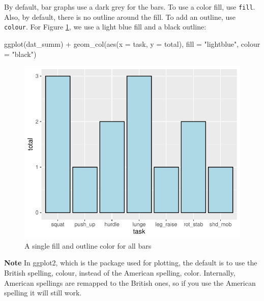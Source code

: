\documentclass[
]{book}
\newenvironment{Shaded}{\begin{snugshade}}{\end{snugshade}}
\newcommand{\AttributeTok}[1]{\textcolor[rgb]{0.77,0.63,0.00}{#1}}
\newcommand{\FunctionTok}[1]{\textcolor[rgb]{0.00,0.00,0.00}{#1}}
\newcommand{\NormalTok}[1]{#1}
\newcommand{\SpecialCharTok}[1]{\textcolor[rgb]{0.00,0.00,0.00}{#1}}
\newcommand{\StringTok}[1]{\textcolor[rgb]{0.31,0.60,0.02}{#1}}
\begin{document}
By default, bar graphs use a dark grey for the bars. To use a color fill, use \texttt{fill}. Also, by default, there is no outline around the fill. To add an outline, use \texttt{colour}. For Figure \ref{fig:FIG-BAR-GRAPH-BASIC-BAR-SINGLE-FILL}, we use a light blue fill and a black outline:

\begin{Shaded}
\begin{Highlighting}[]
\FunctionTok{ggplot}\NormalTok{(dat\_summ) }\SpecialCharTok{+} 
  \FunctionTok{geom\_col}\NormalTok{(}\FunctionTok{aes}\NormalTok{(}\AttributeTok{x =}\NormalTok{ task, }\AttributeTok{y =}\NormalTok{ total), }\AttributeTok{fill =} \StringTok{"lightblue"}\NormalTok{, }\AttributeTok{colour =} \StringTok{"black"}\NormalTok{) }
\end{Highlighting}
\end{Shaded}

\begin{figure}

{\centering \includegraphics{se201_stats_book_files/figure-latex/FIG-BAR-GRAPH-BASIC-BAR-SINGLE-FILL-1} 

}

\caption[A single fill and outline color for all bars]{A single fill and outline color for all bars}\label{fig:FIG-BAR-GRAPH-BASIC-BAR-SINGLE-FILL}
\end{figure}

\textbf{Note} In ggplot2, which is the package used for plotting, the default is to use the British spelling, colour, instead of the American spelling, color. Internally, American spellings are remapped to the British ones, so if you use the American spelling it will still work.
\end{document}
